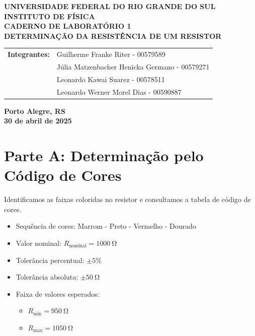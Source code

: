 \documentclass[12pt]{article}
\begin{document}
\begin{center}
    \textbf{\large UNIVERSIDADE FEDERAL DO RIO GRANDE DO SUL} \\
    \textbf{\large INSTITUTO DE FÍSICA} \\
    \vspace{3cm}
    \textbf{\Large CADERNO DE LABORATÓRIO 1} \\
    \vspace{1cm}
    \textbf{\large DETERMINAÇÃO DA RESISTÊNCIA DE UM RESISTOR} \\
    \vspace{3cm}
    
    \begin{tabular}{rl}
        \textbf{Integrantes:} & Guilherme Franke Riter - 00579589 \\
                               & Júlia Matzenbacher Henicka Germano - 00579271 \\
                               & Leonardo Kawai Suarez - 00578511 \\
                               & Leonardo Werner Morel Dias - 00590887 \\
    \end{tabular}
    
    \vspace{12cm}
    \textbf{\large Porto Alegre, RS} \\
    \textbf{\large 30 de abril de 2025} \\ %
\end{center}\newpage

\section*{Parte A: Determinação pelo Código de Cores}

Identificamos as faixas coloridas no resistor e consultamos a tabela de código de cores.

\begin{itemize}
    \item Sequência de cores: Marrom - Preto - Vermelho - Dourado
    \item Valor nominal: \( R_{\text{nominal}} = \SI{1000}{\ohm} \)
    \item Tolerância percentual: \( \pm 5\% \)
    \item Tolerância absoluta: \( \pm \SI{50}{\ohm} \)
    \item Faixa de valores esperados:
    \begin{itemize}
        \item \( R_{\text{min}} = \SI{950}{\ohm} \)
        \item \( R_{\text{max}} = \SI{1050}{\ohm} \)
    \end{itemize}
\end{itemize}
\end{document}
